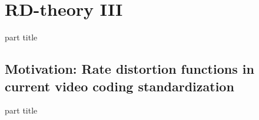 
\DeclareMathOperator{\cwd}{codeword}
\newtheorem{proposition}{Proposition}
\usepackage{forest}
\usepackage{lipsum}
\usepackage{subcaption}
\usepackage{mathtools}


\section{RD-theory III} 
\begin{frame}
 \vspace{12.0ex}
\begin{center}
\begin{beamercolorbox}[sep=12pt,center]{part title}
\insertsection\par
\end{beamercolorbox}
\end{center}
\end{frame}



\subsection{Motivation: Rate distortion functions in current video coding standardization} 
\begin{frame}
 \vspace{12.0ex}
\begin{center}
\begin{beamercolorbox}[sep=12pt,center]{part title}
\insertsubsection\par
\end{beamercolorbox}
\end{center}
\end{frame}


